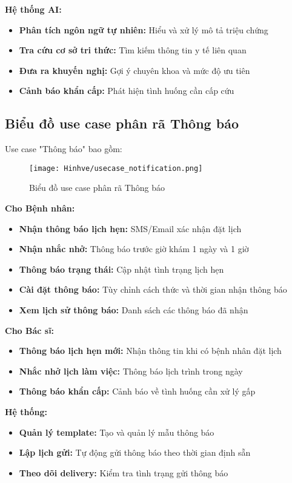 \documentclass[../DoAn.tex]{subfiles}
\begin{document}
\textbf{Hệ thống AI:}
\begin{itemize}
    \item \textbf{Phân tích ngôn ngữ tự nhiên:} Hiểu và xử lý mô tả triệu chứng
    \item \textbf{Tra cứu cơ sở tri thức:} Tìm kiếm thông tin y tế liên quan
    \item \textbf{Đưa ra khuyến nghị:} Gợi ý chuyên khoa và mức độ ưu tiên
    \item \textbf{Cảnh báo khẩn cấp:} Phát hiện tình huống cần cấp cứu
\end{itemize}

\subsection{Biểu đồ use case phân rã Thông báo}
\label{subsection:2.2.6}

Use case "Thông báo" bao gồm:

\begin{figure}[H]
    \centering
    \texttt{[image: Hinhve/usecase\_notification.png]}
    \caption{Biểu đồ use case phân rã Thông báo}
    \label{fig:usecase_notification}
\end{figure}

\textbf{Cho Bệnh nhân:}
\begin{itemize}
    \item \textbf{Nhận thông báo lịch hẹn:} SMS/Email xác nhận đặt lịch
    \item \textbf{Nhận nhắc nhở:} Thông báo trước giờ khám 1 ngày và 1 giờ
    \item \textbf{Thông báo trạng thái:} Cập nhật tình trạng lịch hẹn
    \item \textbf{Cài đặt thông báo:} Tùy chỉnh cách thức và thời gian nhận thông báo
    \item \textbf{Xem lịch sử thông báo:} Danh sách các thông báo đã nhận
\end{itemize}

\textbf{Cho Bác sĩ:}
\begin{itemize}
    \item \textbf{Thông báo lịch hẹn mới:} Nhận thông tin khi có bệnh nhân đặt lịch
    \item \textbf{Nhắc nhở lịch làm việc:} Thông báo lịch trình trong ngày
    \item \textbf{Thông báo khẩn cấp:} Cảnh báo về tình huống cần xử lý gấp
\end{itemize}

\textbf{Hệ thống:}
\begin{itemize}
    \item \textbf{Quản lý template:} Tạo và quản lý mẫu thông báo
    \item \textbf{Lập lịch gửi:} Tự động gửi thông báo theo thời gian định sẵn
    \item \textbf{Theo dõi delivery:} Kiểm tra tình trạng gửi thông báo
\end{itemize}
\end{document}
